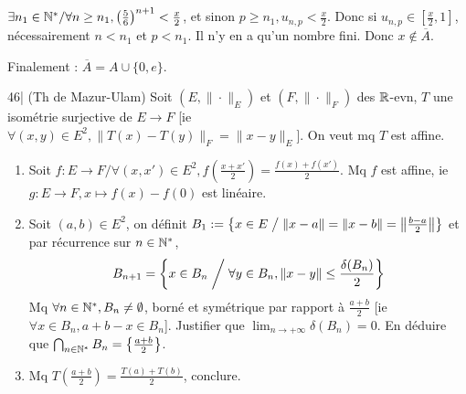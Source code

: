 \begin{solution}
\begin{itemize}
  \begin{center}
  \end{center}

  $\exists n_1 \in \mathbb N^* / \forall n \geq n_1, \left(\frac{5}{6}\right)^{n+1} < \frac{x}{2}$, et sinon $p \geq n_1, u_{n,p} < \frac{x}{2}$.
  Donc si $u_{n,p} \in \left[\frac{x}{2}, 1\right]$, nécessairement $n < n_1$ et $p < n_1$.
  Il n'y en a qu'un nombre fini.
  Donc $x \notin \overline{A}$.
\end{itemize}
Finalement : $\boxed{\overline{A} = A \cup \{0, e\}}$.
\end{solution}


\begin{statementbox}
46| (Th de Mazur-Ulam)
Soit $(E, \|\cdot\|_E)$ et $(F, \|\cdot\|_F)$ des $\mathbb R$-evn, $T$ une isométrie surjective de $E \to F$ [ie $\forall (x, y) \in E^2, \|T(x) - T(y)\|_F = \|x - y\|_E$].
On veut mq $T$ est affine.
\begin{enumerate}[label=\alph*)]
  \item Soit $f : E \to F / \forall (x, x') \in E^2, f\left(\frac{x + x'}{2}\right) = \frac{f(x) + f(x')}{2}$. Mq $f$ est affine, ie $g : E \to F, x \mapsto f(x) - f(0)$ est linéaire.
  \item Soit $(a, b) \in E^2$, on définit $B_1 := \left\{ x \in E \;\middle/\; \|x - a\| = \|x - b\| = \left\|\frac{b - a}{2}\right\| \right\}$ et par récurrence sur $n \in \mathbb N^*$,
  \[ B_{n+1} = \left\{ x \in B_n \;\middle/\; \forall y \in B_n, \|x - y\| \leq \frac{\delta(B_n)}{2} \right\} \]
  Mq $\forall n \in \mathbb N^*, B_n \neq \emptyset$, borné et symétrique par rapport à $\frac{a + b}{2}$ [ie $\forall x \in B_n, a + b - x \in B_n$].
  Justifier que $\lim_{n \to +\infty} \delta(B_n) = 0$.
  En déduire que $\bigcap_{n \in \mathbb N^*} B_n = \left\{\frac{a + b}{2}\right\}$.
  \item Mq $T\left(\frac{a + b}{2}\right) = \frac{T(a) + T(b)}{2}$, conclure.
\end{enumerate}
\end{statementbox}

